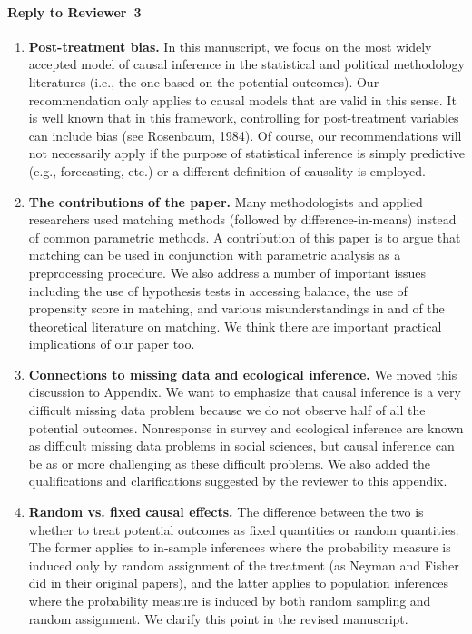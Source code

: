 \documentclass[11pt]{article}
\begin{document}

\paragraph{Reply to Reviewer~3}

\begin{enumerate}
  
\item {\bf Post-treatment bias.} In this manuscript, we focus on the
  most widely accepted model of causal inference in the statistical
  and political methodology literatures (i.e., the one based on the
  potential outcomes). Our recommendation only applies to causal
  models that are valid in this sense. It is well known that in this
  framework, controlling for post-treatment variables can include bias
  (see Rosenbaum, 1984).  Of course, our recommendations will not
  necessarily apply if the purpose of statistical inference is simply
  predictive (e.g., forecasting, etc.) or a different definition of
  causality is employed.
  
\item {\bf The contributions of the paper.} Many methodologists and
  applied researchers used matching methods (followed by
  difference-in-means) instead of common parametric methods. A
  contribution of this paper is to argue that matching can be used in
  conjunction with parametric analysis as a preprocessing procedure.
  We also address a number of important issues including the use of
  hypothesis tests in accessing balance, the use of propensity score
  in matching, and various misunderstandings in and of the theoretical
  literature on matching. We think there are important practical
  implications of our paper too.
  
\item {\bf Connections to missing data and ecological inference.} We
  moved this discussion to Appendix. We want to emphasize that causal
  inference is a very difficult missing data problem because we do not
  observe half of all the potential outcomes. Nonresponse in survey
  and ecological inference are known as difficult missing data
  problems in social sciences, but causal inference can be as or more
  challenging as these difficult problems.  We also added the
  qualifications and clarifications suggested by the reviewer to this
  appendix.

\item {\bf Random vs. fixed causal effects.} The difference between
  the two is whether to treat potential outcomes as fixed quantities
  or random quantities. The former applies to in-sample inferences where
  the probability measure is induced only by random assignment of the
  treatment (as Neyman and Fisher did in their original papers), and
  the latter applies to population inferences where the probability
  measure is induced by both random sampling and random assignment. We
  clarify this point in the revised manuscript.
  

\end{enumerate}
\end{document}
